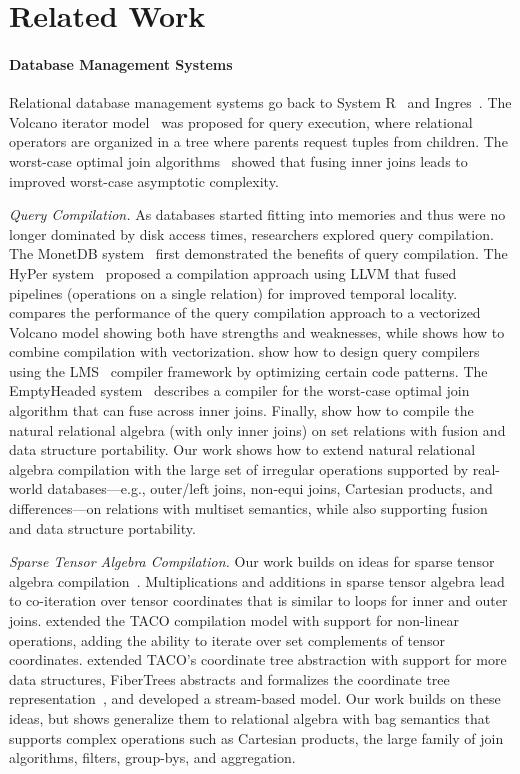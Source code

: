 \section{Related Work}
\label{sec:related-work}

\paragraph{Database Management Systems}

Relational database management systems go back to System R~\cite{chamberlin1981} and Ingres~\cite{stonebraker1976}. The Volcano iterator model~\cite{volcano} was proposed for query execution, where relational operators are organized in a tree where parents request tuples from children.  The worst-case optimal join algorithms~\cite{ngo-skew,leapfrog-triejoin} showed that fusing inner joins leads to improved worst-case asymptotic complexity.

\emph{Query Compilation.}
As databases started fitting into memories and thus were no longer dominated by disk access times, researchers explored query compilation. The MonetDB system~\cite{monetdb} first demonstrated the benefits of query compilation. The HyPer system~\cite{hyper} proposed a compilation approach using LLVM that fused pipelines (operations on a single relation) for improved temporal locality. \citet{kersten2018} compares the performance of the query compilation approach to a vectorized Volcano model showing both have strengths and weaknesses, while \citet{menon2017} shows how to combine compilation with vectorization. \citet{klonatos2014} show how to design query compilers using the LMS~\cite{lms} compiler framework by optimizing certain code patterns. The EmptyHeaded system~\cite{emptyheaded} describes a compiler for the worst-case optimal join algorithm that can fuse across inner joins. Finally, \citet{indexed-streams} show how to compile the natural relational algebra (with only inner joins) on set relations with fusion and data structure portability. Our work shows how to extend natural relational algebra compilation with the large set of irregular operations supported by real-world databases---e.g., outer/left joins, non-equi joins, Cartesian products, and differences---on relations with multiset semantics, while also supporting fusion and data structure portability.

\emph{Sparse Tensor Algebra Compilation.}
Our work builds on ideas for sparse tensor algebra compilation~\cite{kjolstad2017}. Multiplications and additions in sparse tensor algebra lead to co-iteration over tensor coordinates that is similar to loops for inner and outer joins. \citet{henry2017} extended the TACO compilation model with support for non-linear operations, adding the ability to iterate over set complements of tensor coordinates. \citet{chou2018} extended TACO's coordinate tree abstraction with support for more data structures,
FiberTrees abstracts and formalizes the coordinate tree representation~\cite{fibertrees}, and \citet{indexed-streams} developed a stream-based model. Our work builds on these ideas, but shows generalize them to relational algebra with bag semantics that supports complex operations such as Cartesian products, the large family of join algorithms, filters, group-bys, and aggregation.